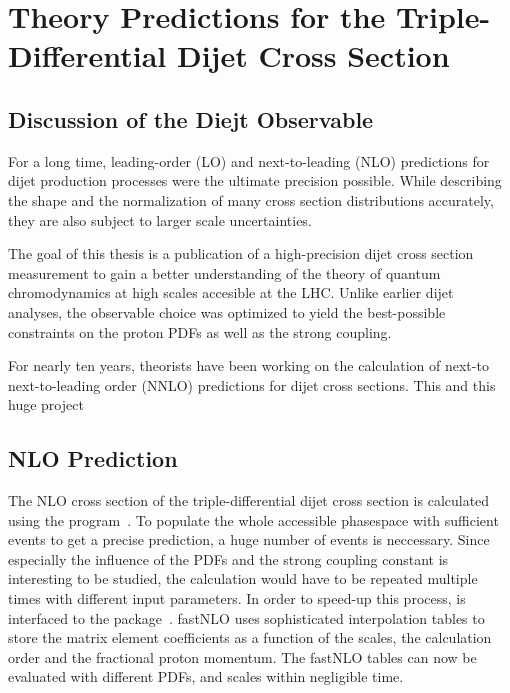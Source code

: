 
\chapter{Theory Predictions for the Triple-Differential Dijet Cross Section}

\section{Discussion of the Diejt Observable}

For a long time, leading-order (LO) and next-to-leading (NLO) predictions
for dijet production processes were the ultimate precision possible. While
describing the shape and the normalization of many cross section distributions
accurately, they are also subject to larger scale uncertainties. 

The goal of this thesis is a publication of a high-precision dijet cross section
measurement to gain a better understanding of the theory of quantum chromodynamics
at high scales accesible at the LHC. Unlike earlier dijet analyses, the observable
choice was optimized to yield the best-possible constraints on the proton PDFs as well
as the strong coupling.

For nearly ten years, theorists have been working on the calculation of next-to
next-to-leading order (NNLO) predictions for dijet cross sections. This  and this
huge project



\section{NLO Prediction}

The NLO cross section of the triple-differential dijet cross section is
calculated using the \NLOJETPP program~\cite{nlojetpp}. To populate the whole
accessible phasespace with sufficient events to get a precise prediction, a huge
number of events is neccessary. Since especially the influence of the PDFs and
the strong coupling constant is interesting to be studied, the calculation would
have to be repeated multiple times with different input parameters. In order to
speed-up this process, \NLOJETPP is interfaced to the \fastNLO
package~\cite{fastnlo}. fastNLO uses sophisticated interpolation tables to store
the matrix element coefficients as a function of the scales, the calculation
order and the fractional proton momentum. The fastNLO tables can now be evaluated with
different PDFs, \as and scales within negligible time. 

